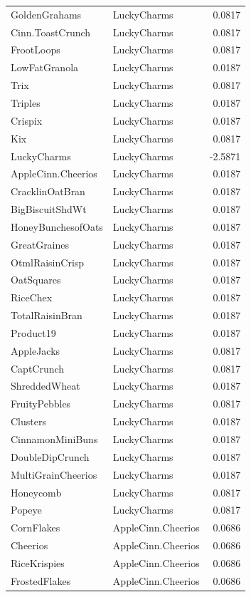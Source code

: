 \begin{longtable}{llr}
GoldenGrahams & LuckyCharms & 0.0817 \\
Cinn.ToastCrunch & LuckyCharms & 0.0817 \\
FrootLoops & LuckyCharms & 0.0817 \\
LowFatGranola & LuckyCharms & 0.0187 \\
Trix & LuckyCharms & 0.0817 \\
Triples & LuckyCharms & 0.0187 \\
Crispix & LuckyCharms & 0.0187 \\
Kix & LuckyCharms & 0.0817 \\
LuckyCharms & LuckyCharms & -2.5871 \\
AppleCinn.Cheerios & LuckyCharms & 0.0187 \\
CracklinOatBran & LuckyCharms & 0.0187 \\
BigBiscuitShdWt & LuckyCharms & 0.0187 \\
HoneyBunchesofOats & LuckyCharms & 0.0187 \\
GreatGraines & LuckyCharms & 0.0187 \\
OtmlRaisinCrisp & LuckyCharms & 0.0187 \\
OatSquares & LuckyCharms & 0.0187 \\
RiceChex & LuckyCharms & 0.0187 \\
TotalRaisinBran & LuckyCharms & 0.0187 \\
Product19 & LuckyCharms & 0.0187 \\
AppleJacks & LuckyCharms & 0.0817 \\
CaptCrunch & LuckyCharms & 0.0817 \\
ShreddedWheat & LuckyCharms & 0.0187 \\
FruityPebbles & LuckyCharms & 0.0817 \\
Clusters & LuckyCharms & 0.0187 \\
CinnamonMiniBuns & LuckyCharms & 0.0187 \\
DoubleDipCrunch & LuckyCharms & 0.0187 \\
MultiGrainCheerios & LuckyCharms & 0.0187 \\
Honeycomb & LuckyCharms & 0.0817 \\
Popeye & LuckyCharms & 0.0817 \\
CornFlakes & AppleCinn.Cheerios & 0.0686 \\
Cheerios & AppleCinn.Cheerios & 0.0686 \\
RiceKrispies & AppleCinn.Cheerios & 0.0686 \\
FrostedFlakes & AppleCinn.Cheerios & 0.0686 \\

\end{longtable}
